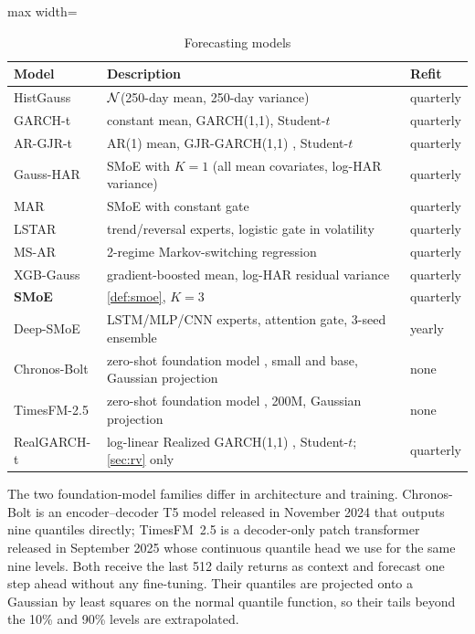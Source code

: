 \begin{table}[t]\centering\small
\caption{Forecasting models}\label{tab:models}
\begin{adjustbox}{max width=\textwidth}\begin{tabular}{lll}\toprule
Model & Description & Refit\\\midrule
HistGauss & $\mathcal{N}$(250-day mean, 250-day variance) & quarterly\\
GARCH-t & constant mean, GARCH(1,1), Student-$t$ \citep{bollerslev1986generalized} & quarterly\\
AR-GJR-t & AR(1) mean, GJR-GARCH(1,1) \citep{glosten1993relation}, Student-$t$ & quarterly\\
Gauss-HAR & SMoE with $K=1$ (all mean covariates, log-HAR variance) & quarterly\\
MAR & SMoE with constant gate \citep{wong2001mixture} & quarterly\\
LSTAR & trend/reversal experts, logistic gate in volatility & quarterly\\
MS-AR & 2-regime Markov-switching regression \citep{hamilton1989new} & quarterly\\
XGB-Gauss & gradient-boosted mean, log-HAR residual variance & quarterly\\
\textbf{SMoE} & \cref{def:smoe}, $K=3$ & quarterly\\
Deep-SMoE & LSTM/MLP/CNN experts, attention gate, 3-seed ensemble & yearly\\
Chronos-Bolt & zero-shot foundation model \citep{ansari2024chronos}, small and base, Gaussian projection & none\\
TimesFM-2.5 & zero-shot foundation model \citep{das2024decoder}, 200M, Gaussian projection & none\\
\midrule
RealGARCH-t & log-linear Realized GARCH(1,1) \citep{hansen2012realized}, Student-$t$; \cref{sec:rv} only & quarterly\\
\bottomrule\end{tabular}\end{adjustbox}
\end{table}

\noindent The two foundation-model families differ in architecture and training. Chronos-Bolt is an
encoder--decoder T5 model released in November 2024 that outputs nine quantiles directly; TimesFM~2.5
is a decoder-only patch transformer released in September 2025 whose continuous quantile head we use
for the same nine levels. Both receive the last 512 daily returns as context and forecast one step
ahead without any fine-tuning. Their quantiles are projected onto a Gaussian by least squares on the
normal quantile function, so their tails beyond the 10\% and 90\% levels are extrapolated.

